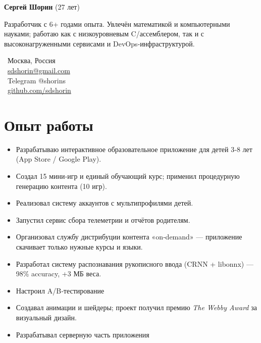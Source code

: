 \documentclass{dodiresume}
\begin{document}
\begin{minipage}{0.7\textwidth}
\begin{flushleft}
\LARGE \textbf{\textcolor{namecolor}{Сергей Шорин}} \normalsize{(27 лет)}

\vspace{0.3cm}
Разработчик с 6+ годами опыта. Увлечён математикой и компьютерными науками; работаю как с низкоуровневым C/ассемблером, так и с высоконагруженными сервисами и DevOps‑инфраструктурой.
\end{flushleft}
\end{minipage}
\begin{minipage}{0.28\textwidth}
\begin{flushright}
\faMapMarker\ Москва, Россия \\
\faEnvelope\ \href{mailto:sdshorin@gmail.com}{sdshorin@gmail.com} \\
\faPaperPlane\ Telegram @shorins \\
\faGithub\ \href{https://github.com/sdshorin}{github.com/sdshorin}
\end{flushright}
\end{minipage}

\vspace{0.1cm}

\section{Опыт работы}


\begin{itemize}
\item Разрабатываю интерактивное образовательное приложение для детей 3‑8 лет (App Store / Google Play).
\item Создал 15 мини‑игр и единый обучающий курс; применил процедурную генерацию контента (10 игр).
\item Реализовал систему аккаунтов с мультипрофилями детей.
\item Запустил сервис сбора телеметрии и отчётов родителям.
\item Организовал службу дистрибуции контента «on‑demand» — приложение скачивает только нужные курсы и языки.
\item Разработал систему распознавания рукописного ввода (CRNN + libonnx) — 98\% accuracy, +3 МБ веса.
\item Настроил A/B‑тестирование
\item Создавал анимации и шейдеры; проект получил премию \textit{The Webby Award} за визуальный дизайн.
\item Разрабатывал серверную часть приложения
\end{itemize}
\end{document}

